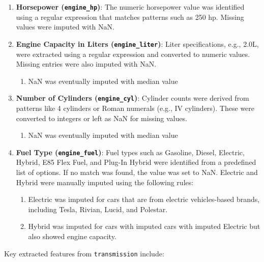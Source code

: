 \documentclass{article}
\begin{document}
\begin{enumerate}
   \item \textbf{Horsepower (\texttt{engine\_hp})}: The numeric horsepower value was identified using a regular expression that matches patterns such as 250 hp. Missing values were imputed with NaN.
   
   \item \textbf{Engine Capacity in Liters (\texttt{engine\_liter})}: Liter specifications, e.g., 2.0L, were extracted using a regular expression and converted to numeric values. Missing entries were also imputed with NaN.
   \begin{enumerate}
       \item NaN was eventually imputed with median value
   \end{enumerate}
   
   \item \textbf{Number of Cylinders (\texttt{engine\_cyl})}: Cylinder counts were derived from patterns like 4 cylinders or Roman numerals (e.g., IV cylinders). These were converted to integers or left as NaN for missing values.
   \begin{enumerate}
       \item NaN was eventually imputed with median value
   \end{enumerate}
   
   \item \textbf{Fuel Type (\texttt{engine\_fuel})}: Fuel types such as Gasoline, Diesel, Electric, Hybrid, E85 Flex Fuel, and Plug-In Hybrid were identified from a predefined list of options. If no match was found, the value was set to NaN. Electric and Hybrid were manually imputed using the following rules:
   \begin{enumerate}
       \item Electric was imputed for cars that are from electric vehicles-based brands, including Tesla, Rivian, Lucid, and Polestar.
       \item Hybrid was imputed for cars with imputed cars with imputed Electric but also showed engine capacity.
   \end{enumerate}
\end{enumerate}

Key extracted features from \texttt{transmission} include:
\end{document}
